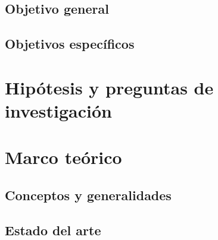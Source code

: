 \subsection{Objetivo general}
\subsection{Objetivos específicos}

\section{Hipótesis y preguntas de investigación} %


\section{Marco teórico} %

\subsection{Conceptos y generalidades}



\subsection{Estado del arte} %




